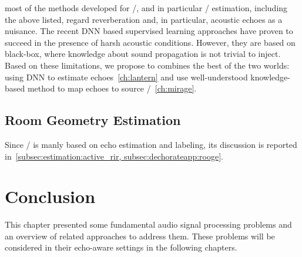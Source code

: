  most of the methods developed for \SSL/, and in particular \DOAs/ estimation, including the above listed, regard reverberation and, in particular, acoustic echoes as a nuisance.
The recent \ac{DNN} based supervised learning approaches have proven to succeed in the presence of harsh acoustic conditions.
However, they are based on black-box, where knowledge about sound propagation is not trivial to inject.
Based on these limitations, we propose to combines the best of the two worlds:
using \ac{DNN} to estimate echoes~\cref{ch:lantern} and use well-understood knowledge-based method to map echoes to source \DOAs/~\cref{ch:mirage}.


\subsection{Room Geometry Estimation}
Since \RooGE/ is manly based on echo estimation and labeling, its discussion is reported in~\cref{subsec:estimation:active_rir, subsec:dechorateapp:rooge}.


\section{Conclusion}\label{sec:application:conclusion}
This chapter presented some fundamental audio signal processing problems and an overview of related approaches to address them.
These problems will be considered in their echo-aware settings in the following chapters.

